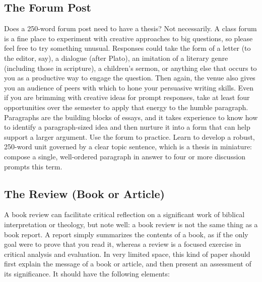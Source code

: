 \documentclass[11pt]{article}
\begin{document}
\subsection{The Forum Post}

Does a 250-word forum post need to have a thesis? Not necessarily. A
class forum is a fine place to experiment with creative approaches to
big questions, so please feel free to try something unusual. Responses
could take the form of a letter (to the editor, say), a dialogue (after
Plato), an imitation of a literary genre (including those in scripture),
a children's sermon, or anything else that occurs to you as a productive
way to engage the question. Then again, the venue also gives you an
audience of peers with which to hone your persuasive writing skills.
Even if you are brimming with creative ideas for prompt responses, take
at least four opportunities over the semester to apply that energy to
the humble paragraph. Paragraphs are the building blocks of essays, and
it takes experience to know how to identify a paragraph-sized idea and
then nurture it into a form that can help support a larger argument. Use
the forum to practice. Learn to develop a robust, 250-word unit governed
by a clear topic sentence, which is a thesis in miniature: compose a
single, well-ordered paragraph in answer to four or more discussion
prompts this term.

\subsection{The Review (Book or Article)}

A book review can facilitate critical reflection on a significant work
of biblical interpretation or theology, but note well: a book review is
not the same thing as a book report. A report simply summarizes the
contents of a book, as if the only goal were to prove that you read it,
whereas a review is a focused exercise in critical analysis and
evaluation. In very limited space, this kind of paper should first
explain the message of a book or article, and then present an assessment
of its significance. It should have the following elements:
\end{document}
